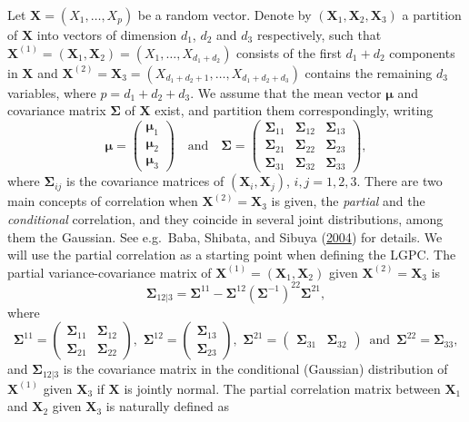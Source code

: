 \documentclass[
  12pt,
  letterpaper]{article}
\newcommand{\X}{\bm{X}}
\newcommand{\Xone}{\bm{X}^{(1)}}
\newcommand{\Xtwo}{\bm{X}^{(2)}}
\newcommand{\fmu}{\bm{\mu}}
\newcommand{\fSigma}{\bm{\Sigma}}
\theoremstyle{definition}
\theoremstyle{definition}
\theoremstyle{definition}
\theoremstyle{remark}
\begin{document}
Let \(\X = (X_1, \ldots, X_p)\) be a random vector. Denote by \((\X_1,\X_2,\X_3)\) a partition of \(\X\) into vectors of dimension \(d_1\), \(d_2\) and \(d_3\) respectively, such that \(\Xone = (\X_1, \X_2) = (X_1, \ldots,X_{d_1 + d_2})\) consists of the first \(d_1+d_2\) components in \(\X\) and \(\Xtwo = \X_3 = (X_{d_1+d_2+1}, \ldots, X_{d_1+d_2+d_3})\) contains the remaining \(d_3\) variables, where \(p = d_1+d_2+d_3\). We assume that the mean vector \(\fmu\) and covariance matrix \(\fSigma\) of \(\X\) exist, and partition them correspondingly, writing
\begin{equation}
\fmu = \begin{pmatrix} \fmu_1 \\ \fmu_2 \\ \fmu_3 \end{pmatrix} \,\,\,\, \textrm{ and } \,\,\,\, \fSigma = \begin{pmatrix} \fSigma_{11} & \fSigma_{12} & \fSigma_{13} \\ \fSigma_{21} & \fSigma_{22} & \fSigma_{23} \\ \fSigma_{31} & \fSigma_{32} & \fSigma_{33}\end{pmatrix},
\label{eq:matrixpartition}
\end{equation}
where \(\fSigma_{ij}\) is the covariance matrices of \((\X_i, \X_j)\), \(i,j = 1,2,3\). There are two main concepts of correlation when \(\Xtwo = \X_3\) is given, the \emph{partial} and the \emph{conditional} correlation, and they coincide in several joint distributions, among them the Gaussian. See e.g.~Baba, Shibata, and Sibuya (\protect\hyperlink{ref-baba2004partial}{2004}) for details. We will use the partial correlation as a starting point when defining the LGPC. The partial variance-covariance matrix of \(\Xone = (\X_1, \X_2)\) given \(\Xtwo = \X_3\) is
\begin{equation}
\fSigma_{12|3} = \fSigma^{11} - \fSigma^{12}\left(\fSigma^{-1}\right)^{22}\fSigma^{21},
\label{eq:matrixpartial}
\end{equation}
where
\[\fSigma^{11} = \begin{pmatrix} \fSigma_{11} & \fSigma_{12} \\ \fSigma_{21} & \fSigma_{22} \end{pmatrix}, \,\, \fSigma^{12} = \begin{pmatrix} \fSigma_{13} \\ \fSigma_{23} \end{pmatrix}, \,\,\fSigma^{21} = \begin{pmatrix} \fSigma_{31} & \fSigma_{32} \end{pmatrix} \, \textrm{ and } \, \fSigma^{22} = \fSigma_{33},\]
and \(\fSigma_{12|3}\) is the covariance matrix in the conditional (Gaussian) distribution of \(\Xone\) given \(\X_3\) if \(\X\) is jointly normal. The partial correlation matrix between \(\X_1\) and \(\X_2\) given \(\X_3\) is naturally defined as
\end{document}
